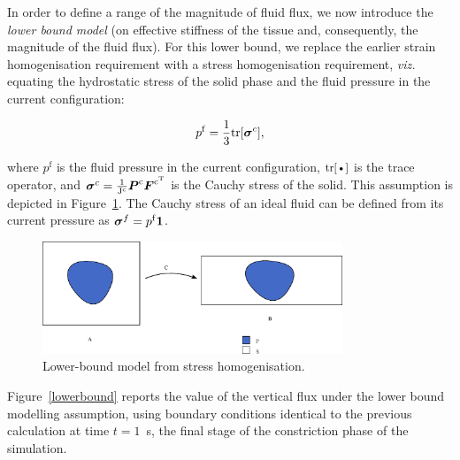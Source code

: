 In order to define a range of the magnitude of fluid flux, we now
introduce the {\em lower bound model} (on effective stiffness of the
tissue and, consequently, the magnitude of the fluid flux). For this
lower bound, we replace the earlier strain homogenisation requirement
with a stress homogenisation requirement, {\em viz.} equating the
hydrostatic stress of the solid phase and the fluid pressure in the
current configuration:

\begin{equation}
p^{\mathrm{f}}=\frac{1}{3} \mathrm{\small{tr}}[\mbox{\boldmath$\sigma$}^{c}],
\label{equalpr}
\end{equation}

\noindent where $p^{\mathrm{f}}$ is the fluid pressure in the current
configuration, $\mbox{\small{tr}[\textbullet]}$ is the trace operator, and
$\mbox{\boldmath$\sigma$}^{c}=\frac{1}{\mathrm{J^{c}}} \mbox{\boldmath$ P$}^{\mathrm{c}}
\mbox{\boldmath$ F$}^{\mathrm{c}^{\mathrm{T}}}$ is the Cauchy stress of the solid. This
assumption is depicted in Figure~\ref{lower-bound-model}. The
Cauchy stress of an ideal fluid can be defined from its current
pressure as \mbox{$\mbox{\boldmath$\sigma$}^{f}= p^{\mathrm{f}} {\bf 1}$.} 

\begin{figure}[ht]
  \centering
  \includegraphics[width=0.8\textwidth]{images/elucidation/homogeneous-stress}
  \caption{Lower-bound model from stress homogenisation.}
  \label{lower-bound-model}
\end{figure}

Figure~{\ref{lowerbound}} reports the value of the vertical flux under
the lower bound modelling assumption, using boundary conditions identical to the
previous calculation at time $t=1$~s, the final stage of the
constriction phase of the simulation.

